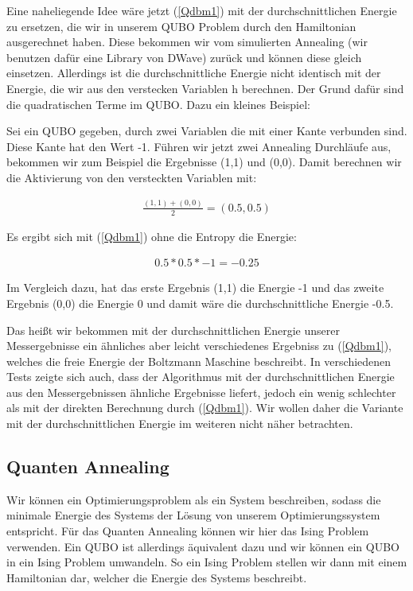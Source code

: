 Eine naheliegende Idee wäre jetzt (\ref{Qdbm1}) mit der durchschnittlichen Energie zu ersetzen, die wir in unserem QUBO Problem durch den Hamiltonian ausgerechnet haben. Diese bekommen wir vom simulierten Annealing (wir benutzen dafür eine Library von DWave) zurück und können diese gleich einsetzen.
Allerdings ist die durchschnittliche Energie nicht identisch mit der Energie, die wir aus den verstecken Variablen h berechnen. Der Grund dafür sind die quadratischen Terme im QUBO. Dazu ein kleines Beispiel:

Sei ein QUBO gegeben, durch zwei Variablen die mit einer Kante verbunden sind. Diese Kante hat den Wert -1. Führen wir jetzt zwei Annealing Durchläufe aus, bekommen wir zum Beispiel die Ergebnisse (1,1) und (0,0). Damit berechnen wir die Aktivierung von den versteckten Variablen mit:

\begin{align}
	\frac{(1, 1) + (0, 0)}{2} = (0.5, 0.5)
\end{align}

Es ergibt sich mit (\ref{Qdbm1}) ohne die Entropy die Energie:

\begin{align}
	0.5 * 0.5 * -1 = -0.25
\end{align}

Im Vergleich dazu, hat das erste Ergebnis (1,1) die Energie -1 und das zweite Ergebnis (0,0) die Energie 0 und damit wäre die durchschnittliche Energie -0.5.

Das heißt wir bekommen mit der durchschnittlichen Energie unserer Messergebnisse ein ähnliches aber leicht verschiedenes Ergebniss zu (\ref{Qdbm1}), welches die freie Energie der Boltzmann Maschine beschreibt. In verschiedenen Tests zeigte sich auch, dass der Algorithmus mit der durchschnittlichen Energie aus den Messergebnissen ähnliche Ergebnisse liefert, jedoch ein wenig schlechter als mit der direkten Berechnung durch  (\ref{Qdbm1}). Wir wollen daher die Variante mit der durchschnittlichen Energie im weiteren nicht näher betrachten.

\subsection{Quanten Annealing}
\label{subsec:QA}

Wir können ein Optimierungsproblem als ein System beschreiben, sodass die minimale Energie des Systems der Lösung von unserem Optimierungssystem entspricht.
Für das Quanten Annealing können wir hier das Ising Problem verwenden. Ein QUBO ist allerdings äquivalent dazu und wir können ein QUBO in ein Ising Problem umwandeln.
So ein Ising Problem stellen wir dann mit einem Hamiltonian dar, welcher die Energie des Systems beschreibt.

